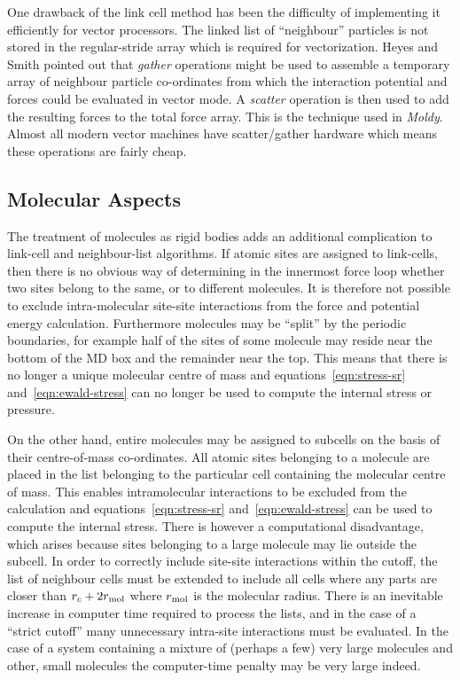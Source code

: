 \documentclass[a4paper,twoside]{report}
\newcommand{\moldy}{\emph{Moldy}}
\begin{document}
One drawback of the link cell method has been the difficulty of
implementing it efficiently for vector processors.  The linked list of
``neighbour'' particles is not stored in the regular-stride array
which is required for vectorization.  Heyes and Smith\cite{heyes:87}
pointed out that \emph{gather} operations might be used to assemble a
temporary array of neighbour particle co-ordinates from which the
interaction potential and forces could be evaluated in vector mode.  A
\emph{scatter} operation is then used to add the resulting forces to
the total force array.  This is the technique used in \moldy.  Almost
all modern vector machines have scatter/gather hardware which means
these operations are fairly cheap.

\subsection{Molecular Aspects}

The treatment of molecules as rigid bodies adds an additional
complication to link-cell and neighbour-list algorithms.  If atomic
sites are assigned to link-cells, then there is no obvious way of
determining in the innermost force loop whether two sites belong to
the same, or to different molecules.  It is therefore not possible to
exclude intra-molecular site-site interactions from the force and
potential energy calculation.  Furthermore molecules may be
``split'' by the periodic boundaries, for example half of the sites of
some molecule may reside near the bottom of the MD box and the
remainder near the top.  This means that there is no longer a unique
molecular centre of mass and equations~\ref{eqn:stress-sr}
and~\ref{eqn:ewald-stress} can no longer be used to compute the internal
stress or pressure.

On the other hand, entire molecules may be assigned to subcells on the
basis of their centre-of-mass co-ordinates. All atomic sites belonging
to a molecule are placed in the list belonging to the particular cell
containing the molecular centre of mass.  This enables intramolecular
interactions to be excluded from the calculation and
equations~\ref{eqn:stress-sr} and~\ref{eqn:ewald-stress} can be used to
compute the internal stress.  There is however a computational
disadvantage, which arises because sites belonging to a large molecule
may lie outside the subcell.  In order to correctly include site-site
interactions within the cutoff, the list of neighbour cells must be
extended to include all cells where any parts are closer than $r_c + 2
r_\textnormal{mol}$ where $r_\textnormal{mol}$ is the molecular
radius.  There is an inevitable increase in computer time required to
process the lists, and in the case of a ``strict cutoff'' many
unnecessary intra-site interactions must be evaluated.  In the case of
a system containing a mixture of (perhaps a few) very large molecules
and other, small molecules the computer-time penalty may be very large
indeed.
\end{document}
